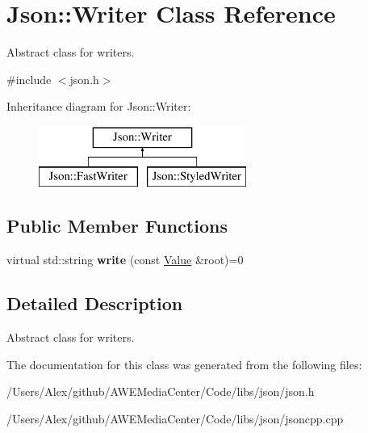\hypertarget{class_json_1_1_writer}{\section{Json\-:\-:Writer Class Reference}
\label{class_json_1_1_writer}
}


Abstract class for writers.  




{\ttfamily \#include $<$json.\-h$>$}

Inheritance diagram for Json\-:\-:Writer\-:\begin{figure}[H]
\begin{center}
\leavevmode
\includegraphics[height=2.000000cm]{class_json_1_1_writer}
\end{center}
\end{figure}
\subsection*{Public Member Functions}
\begin{DoxyCompactItemize}
\item 
\hypertarget{class_json_1_1_writer_a7b2273a4ffd6f32b369ac8a53b7b5a0d}{virtual std\-::string {\bfseries write} (const \hyperlink{class_json_1_1_value}{Value} \&root)=0}\label{class_json_1_1_writer_a7b2273a4ffd6f32b369ac8a53b7b5a0d}

\end{DoxyCompactItemize}


\subsection{Detailed Description}
Abstract class for writers. 

The documentation for this class was generated from the following files\-:\begin{DoxyCompactItemize}
\item 
/\-Users/\-Alex/github/\-A\-W\-E\-Media\-Center/\-Code/libs/json/json.\-h\item 
/\-Users/\-Alex/github/\-A\-W\-E\-Media\-Center/\-Code/libs/json/jsoncpp.\-cpp\end{DoxyCompactItemize}
